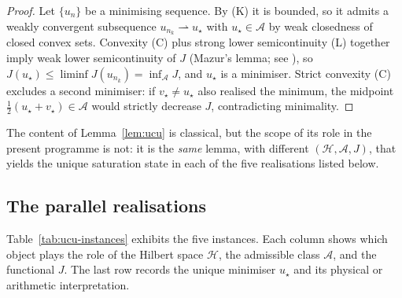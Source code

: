 \documentclass[11pt]{article}
\theoremstyle{definition}
\theoremstyle{remark}
\begin{document}
\begin{proof}
Let $\{u_n\}$ be a minimising sequence. By (K) it is bounded, so it
admits a weakly convergent subsequence $u_{n_k} \rightharpoonup u_\star$
with $u_\star \in \mathcal{A}$ by weak closedness of closed convex
sets. Convexity (C) plus strong lower semicontinuity (L) together
imply weak lower semicontinuity of $J$ (Mazur's lemma; see
\cite[Prop.~II.1.2]{EkelandTemam1999}), so
$J(u_\star) \leq \liminf J(u_{n_k}) = \inf_{\mathcal{A}} J$, and
$u_\star$ is a minimiser. Strict convexity (C) excludes a second
minimiser: if $v_\star \neq u_\star$ also realised the minimum,
the midpoint $\tfrac{1}{2}(u_\star + v_\star) \in \mathcal{A}$
would strictly decrease $J$, contradicting minimality.
\end{proof}

The content of Lemma~\ref{lem:ucu} is classical, but the scope of
its role in the present programme is not: it is the \emph{same}
lemma, with different $(\mathcal{H}, \mathcal{A}, J)$, that yields
the unique saturation state in each of the five realisations
listed below.

\subsection{The parallel realisations}
\label{sec:ucu-instances}

Table~\ref{tab:ucu-instances} exhibits the five instances.
Each column shows which object plays the role of the Hilbert space
$\mathcal{H}$, the admissible class $\mathcal{A}$, and the
functional $J$. The last row records the unique minimiser $u_\star$
and its physical or arithmetic interpretation.
\end{document}
